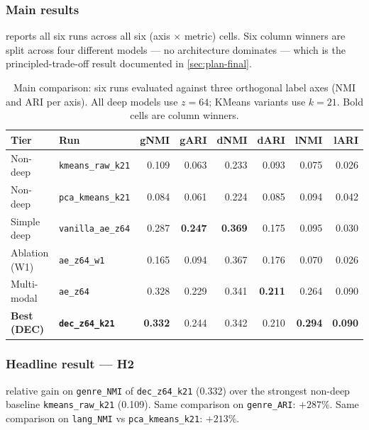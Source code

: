 \documentclass[11pt,a4paper]{article}
\newcommand{\bignumber}[1]{{\fontsize{36pt}{42pt}\sffamily\bfseries\color{brandPrimary}#1}}
\begin{document}
\subsubsection*{Main results}

 reports all six runs across all six (axis $\times$ metric) cells. Six column winners are split across four different models --- no architecture dominates --- which is the principled-trade-off result documented in \cref{sec:plan-final}.

\begin{table}[h]
\centering\small
{}
\caption{Main comparison: six runs evaluated against three orthogonal label axes (NMI and ARI per axis). All deep models use $z=64$; KMeans variants use $k=21$. Bold cells are column winners.}
\label{tab:main-results}
\begin{tabular}{@{}l l rrrrrr@{}}
\toprule
\textbf{Tier} & \textbf{Run} & \textbf{gNMI} & \textbf{gARI} & \textbf{dNMI} & \textbf{dARI} & \textbf{lNMI} & \textbf{lARI} \\
\midrule
Non-deep      & \texttt{kmeans\_raw\_k21}  & 0.109 & 0.063 & 0.233 & 0.093 & 0.075 & 0.026 \\
Non-deep      & \texttt{pca\_kmeans\_k21}  & 0.084 & 0.061 & 0.224 & 0.085 & 0.094 & 0.042 \\
Simple deep   & \texttt{vanilla\_ae\_z64}  & 0.287 & \textbf{0.247} & \textbf{0.369} & 0.175 & 0.095 & 0.030 \\
Ablation (W1) & \texttt{ae\_z64\_w1}       & 0.165 & 0.094 & 0.367 & 0.176 & 0.070 & 0.026 \\
Multi-modal   & \texttt{ae\_z64}           & 0.328 & 0.229 & 0.341 & \textbf{0.211} & 0.264 & 0.090 \\
\textbf{Best (DEC)} & \texttt{\textbf{dec\_z64\_k21}} & \textbf{0.332} & 0.244 & 0.342 & 0.210 & \textbf{0.294} & \textbf{0.090} \\
\bottomrule
\end{tabular}
\end{table}

\subsubsection*{Headline result --- H2}

\begin{headlinebox}
\noindent\bignumber{$+205\%$} \hfill \begin{minipage}[b]{0.65\linewidth}\raggedleft\small relative gain on \texttt{genre\_NMI} of \texttt{dec\_z64\_k21} (0.332) over the strongest non-deep baseline \texttt{kmeans\_raw\_k21} (0.109). Same comparison on \texttt{genre\_ARI}: $+287\%$. Same comparison on \texttt{lang\_NMI} vs \texttt{pca\_kmeans\_k21}: $+213\%$.\end{minipage}
\end{headlinebox}
\end{document}
